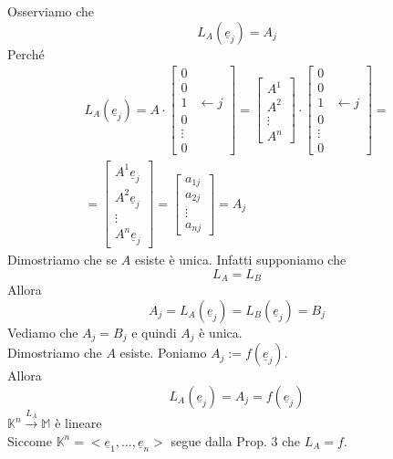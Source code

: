 \begin{dimostrazione}[Prop. 1]
    Osserviamo che
    \begin{equation}
        L_A(\underline{e}_j)=A_j
    \end{equation}
    Perché
    \begin{gather}
        L_A(\underline{e}_j)=A\cdot \begin{bmatrix}
            0 \\ 0 \\ 1 & \leftarrow j \\ 0 \\ \vdots \\ 0
        \end{bmatrix} = \begin{bmatrix}
            A^1 \\ A^2 \\ \vdots \\ A^n
        \end{bmatrix} \cdot \begin{bmatrix}
            0 \\ 0 \\ 1 & \leftarrow j \\ 0 \\ \vdots \\ 0
        \end{bmatrix} = \\
        = \begin{bmatrix}
            A^1 \underline{e}_j \\ A^2 \underline{e}_j \\ \vdots \\ A^n \underline{e}_j
        \end{bmatrix} = \begin{bmatrix}
            a _{1j} \\ a _{2j} \\ \vdots \\ a _{nj}
        \end{bmatrix} = A_j
    \end{gather}
    Dimostriamo che se $A$ esiste è unica. Infatti supponiamo che 
    \begin{equation}
        L_A=L_B
    \end{equation}
    Allora
    \begin{equation}
        A_j=L_A(\underline{e}_j)=L_B(\underline{e}_j)=B_j
    \end{equation}
    Vediamo che $A_j=B_j$ e quindi $A_j$ è unica. \\
    Dimostriamo che $A$ esiste. Poniamo $A_j:=f(\underline{e}_j)$.\\
    Allora
    \begin{equation}
        L_A(\underline{e}_j)=A_j=f(\underline{e}_j)
    \end{equation}
    $\mathbb{K}^n\xrightarrow{L_A}\mathbb{M}$ è lineare\\
    Siccome $\mathbb{K}^n=<\underline{e}_1,...,\underline{e}_n>$ segue dalla Prop. 3 che $L_A=f$.
\end{dimostrazione}
